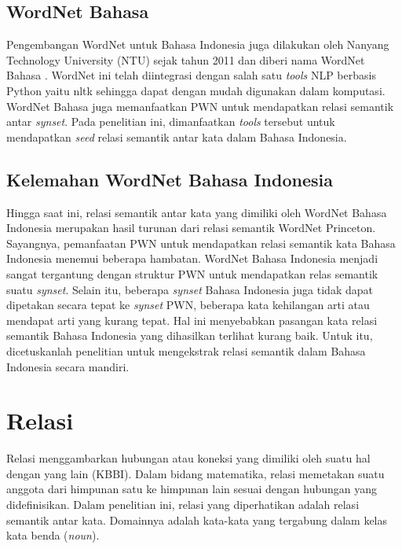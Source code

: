 \subsection{WordNet Bahasa}
Pengembangan WordNet untuk Bahasa Indonesia juga dilakukan oleh Nanyang Technology University (NTU) sejak tahun 2011 dan diberi nama WordNet Bahasa \citep{noor2011creating}. WordNet ini telah diintegrasi dengan salah satu \textit{tools} NLP berbasis Python yaitu nltk sehingga dapat dengan mudah digunakan dalam komputasi. WordNet Bahasa juga memanfaatkan PWN untuk mendapatkan relasi semantik antar \textit{synset}. Pada penelitian ini, dimanfaatkan \textit{tools} tersebut untuk mendapatkan \textit{seed} relasi semantik antar kata dalam Bahasa Indonesia.

\subsection{Kelemahan WordNet Bahasa Indonesia}
Hingga saat ini, relasi semantik antar kata yang dimiliki oleh WordNet Bahasa Indonesia merupakan hasil turunan dari relasi semantik WordNet Princeton. Sayangnya, pemanfaatan PWN untuk mendapatkan relasi semantik kata Bahasa Indonesia menemui beberapa hambatan. WordNet Bahasa Indonesia menjadi sangat tergantung dengan struktur PWN untuk mendapatkan relas semantik suatu \textit{synset}. Selain itu, beberapa \textit{synset} Bahasa Indonesia juga tidak dapat dipetakan secara tepat ke \textit{synset} PWN, beberapa kata kehilangan arti atau mendapat arti yang kurang tepat. Hal ini menyebabkan pasangan kata relasi semantik Bahasa Indonesia yang dihasilkan terlihat kurang baik. Untuk itu, dicetuskanlah penelitian untuk mengekstrak relasi semantik dalam Bahasa Indonesia secara mandiri. 


\section{Relasi}
Relasi menggambarkan hubungan atau koneksi yang dimiliki oleh suatu hal dengan yang lain (KBBI). Dalam bidang matematika, relasi memetakan suatu anggota dari himpunan satu ke himpunan lain sesuai dengan hubungan yang didefinisikan. Dalam penelitian ini, relasi yang diperhatikan adalah relasi semantik antar kata. Domainnya adalah kata-kata yang tergabung dalam kelas kata benda (\textit{noun}).

